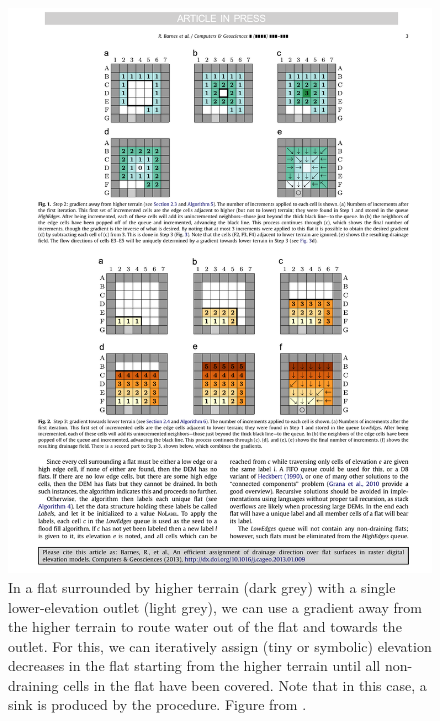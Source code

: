 \begin{figure}[htbp]
\centering
\includegraphics[width=1.0\linewidth]{figs/ht.pdf}
\caption{In a flat surrounded by higher terrain (dark grey) with a single lower-elevation outlet (light grey), we can use a gradient away from the higher terrain to route water out of the flat and towards the outlet.
For this, we can iteratively assign (tiny or symbolic) elevation decreases in the flat starting from the higher terrain until all non-draining cells in the flat have been covered.
Note that in this case, a sink is produced by the procedure.
Figure from \citet{Barnes14}.}%
\label{fig:ht}
\end{figure}

